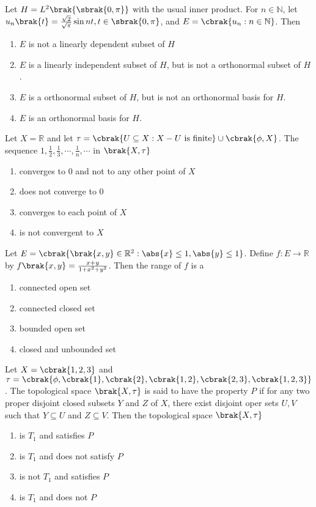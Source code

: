 \item{
Let $H=L^2\brak{\sbrak{0,\pi}}$ with the usual inner product. For $n\in \mathbb{N}$, let $u_n\brak{t}=\frac{\sqrt{2}}{\sqrt{\pi}}\sin nt,t\in\sbrak{0,\pi}$, and $E=\cbrak{u_n:n\in\mathbb{N}}$. Then
\begin{enumerate}
\item $E$ is not a linearly dependent subset of $H$
\item $E$ is a linearly independent subset of $H$, but is not a orthonormal subset of $H$.
\item $E$ is a orthonormal subset of $H$, but is not an orthonormal basis for $H$.
\item $E$ is an orthonormal basis for $H$.
\end{enumerate}
}
\item{
Let $X=\mathbb{R}$ and let $\tau=\cbrak{U\subseteq X:X-U\text{ is finite}}\cup\cbrak{\phi,X}$. The sequence $1,\frac{1}{2},\frac{1}{3},\cdots,\frac{1}{n},\cdots$ in $\brak{X,\tau}$
\begin{multicols}{2}
\begin{enumerate}
\item converges to $0$ and not to any other point of $X$
\item does not converge to $0$
\item converges to each point of $X$  
\item is not convergent to $X$
\end{enumerate}
\end{multicols}
}
\item{
Let $E=\cbrak{\brak{x,y}\in\mathbb{R}^2:\abs{x}\leq 1,\abs{y}\leq 1}$. Define $f:E\rightarrow\mathbb{R}$ by $f\brak{x,y}=\frac{x+y}{1+x^2+y^2}$. Then the range of $f$ is a
\begin{enumerate}
\item connected open set
\item connected closed set
\item bounded open set
\item closed and unbounded set
\end{enumerate}
}
\item{
Let $X=\cbrak{1,2,3}$ and $\tau=\cbrak{\phi,\cbrak{1},\cbrak{2},\cbrak{1,2},\cbrak{2,3},\cbrak{1,2,3}}$. The topological space $\brak{X,\tau}$ is said to have the property $P$ if for any two proper disjoint closed subsets $Y$ and $Z$ of $X$, there exist disjoint oper sets $U,V$ such that $Y\subseteq U$ and $Z\subseteq V$. Then the topological space $\brak{X,\tau}$
\begin{multicols}{2}
\begin{enumerate}
\item is $T_1$ and satisfies $P$
\item is $T_1$ and does not satisfy $P$
\item is not $T_1$ and satisfies $P$
\item is $T_1$ and does not $P$
\end{enumerate}
\end{multicols}
}
